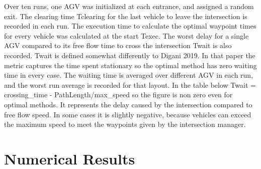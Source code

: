 \documentclass[11pt]{article} %
\begin{document}
Over ten runs, one AGV was initialized at each entrance, and assigned a random exit.   The clearing time Tclearing for the last vehicle to leave the intersection is recorded in each run. The execution time to calculate the optimal waypoint times for every vehicle was calculated at the start Texec. The worst delay for a single AGV compared to its free flow time to cross the intersection Twait is also recorded.
Twait is defined somewhat differently to Digani 2019. In that paper the metric captures the time spent stationary so the optimal method has zero waiting time in every case. The waiting time is averaged over different AGV in each run, and the worst run average is recorded for that layout.
In the table below Twait = crossing\_time - PathLength/max\_speed so the figure is non zero even for optimal methods. It represents the delay caused by the intersection compared to free flow speed. In some cases it is slightly negative, because vehicles can exceed the maximum speed to meet the waypoints given by the intersection manager.   
\section{Numerical Results}


\end{document}
